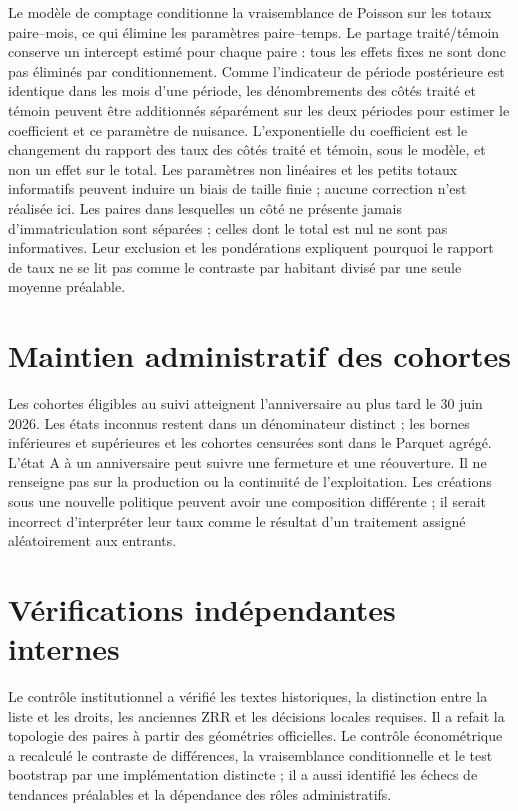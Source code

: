Le modèle de comptage conditionne la vraisemblance de Poisson sur les totaux paire–mois, ce qui élimine les paramètres paire–temps. Le partage traité/témoin conserve un intercept estimé pour chaque paire : tous les effets fixes ne sont donc pas éliminés par conditionnement. Comme l’indicateur de période postérieure est identique dans les mois d’une période, les dénombrements des côtés traité et témoin peuvent être additionnés séparément sur les deux périodes pour estimer le coefficient et ce paramètre de nuisance. L’exponentielle du coefficient est le changement du rapport des taux des côtés traité et témoin, sous le modèle, et non un effet sur le total. Les paramètres non linéaires et les petits totaux informatifs peuvent induire un biais de taille finie ; aucune correction n’est réalisée ici. Les paires dans lesquelles un côté ne présente jamais d’immatriculation sont séparées ; celles dont le total est nul ne sont pas informatives. Leur exclusion et les pondérations expliquent pourquoi le rapport de taux ne se lit pas comme le contraste par habitant divisé par une seule moyenne préalable.

\section{Maintien administratif des cohortes}
\begin{table}[htbp]\centering\small\caption{Maintien administratif : cohortes des communes frontalières}\end{table}

Les cohortes éligibles au suivi atteignent l’anniversaire au plus tard le 30 juin 2026. Les états inconnus restent dans un dénominateur distinct ; les bornes inférieures et supérieures et les cohortes censurées sont dans le Parquet agrégé. L’état A à un anniversaire peut suivre une fermeture et une réouverture. Il ne renseigne pas sur la production ou la continuité de l’exploitation. Les créations sous une nouvelle politique peuvent avoir une composition différente ; il serait incorrect d’interpréter leur taux comme le résultat d’un traitement assigné aléatoirement aux entrants.

\section{Vérifications indépendantes internes}
Le contrôle institutionnel a vérifié les textes historiques, la distinction entre la liste et les droits, les anciennes ZRR et les décisions locales requises. Il a refait la topologie des \BorderPairs{} paires à partir des géométries officielles. Le contrôle économétrique a recalculé le contraste de différences, la vraisemblance conditionnelle et le test bootstrap par une implémentation distincte ; il a aussi identifié les échecs de tendances préalables et la dépendance des rôles administratifs.

